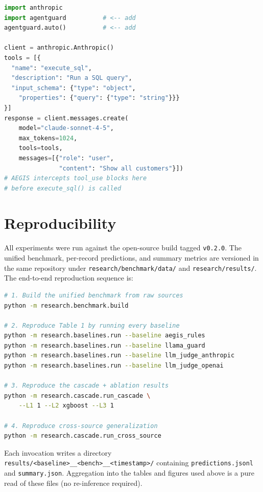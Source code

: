 \begin{lstlisting}[language=Python,caption={A Claude agent with \system{} protection (three added lines).},label=lst:python-integration]
import anthropic
import agentguard          # <-- add
agentguard.auto()          # <-- add

client = anthropic.Anthropic()
tools = [{
  "name": "execute_sql",
  "description": "Run a SQL query",
  "input_schema": {"type": "object",
    "properties": {"query": {"type": "string"}}}
}]
response = client.messages.create(
    model="claude-sonnet-4-5",
    max_tokens=1024,
    tools=tools,
    messages=[{"role": "user",
               "content": "Show all customers"}])
# AEGIS intercepts tool_use blocks here
# before execute_sql() is called
\end{lstlisting}

\section{Reproducibility}
\label{app:repro}

All experiments were run against the open-source \system{} build
tagged \texttt{v0.2.0}. The unified benchmark, per-record predictions,
and summary metrics are versioned in the same repository under
\texttt{research/benchmark/data/} and \texttt{research/results/}.
The end-to-end reproduction sequence is:

\begin{lstlisting}[language=bash,basicstyle=\ttfamily\scriptsize]
# 1. Build the unified benchmark from raw sources
python -m research.benchmark.build

# 2. Reproduce Table 1 by running every baseline
python -m research.baselines.run --baseline aegis_rules
python -m research.baselines.run --baseline llama_guard
python -m research.baselines.run --baseline llm_judge_anthropic
python -m research.baselines.run --baseline llm_judge_openai

# 3. Reproduce the cascade + ablation results
python -m research.cascade.run_cascade \
    --L1 1 --L2 xgboost --L3 1

# 4. Reproduce cross-source generalization
python -m research.cascade.run_cross_source
\end{lstlisting}

Each invocation writes a directory
\texttt{results/<baseline>\_\_<bench>\_\_<timestamp>/}
containing \texttt{predictions.jsonl} and \texttt{summary.json}.
Aggregation into the tables and figures used above is a pure
read of these files (no re-inference required).
